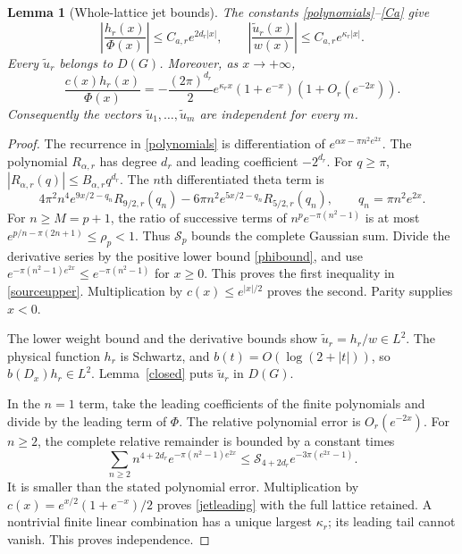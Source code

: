 \documentclass[11pt]{article}
\newtheorem{lemma}[theorem]{Lemma}
\theoremstyle{remark}
\begin{document}
\begin{lemma}[Whole-lattice jet bounds]\label{jetbounds}
The constants \eqref{polynomials}--\eqref{Ca} give
\begin{equation}\label{sourceupper}
 \left|\frac{h_r(x)}{\Phi(x)}\right|
        \le C_{a,r}e^{2d_r|x|},\qquad
 \left|\frac{\widetilde u_r(x)}{w(x)}\right|
        \le C_{a,r}e^{\kappa_r|x|}.
\end{equation}
Every \(\widetilde u_r\) belongs to \(D(G)\).
Moreover, as \(x\to+\infty\),
\begin{equation}\label{jetleading}
 \frac{c(x)h_r(x)}{\Phi(x)}
 =-\frac{(2\pi)^{d_r}}2 e^{\kappa_rx}
                  (1+e^{-x})(1+O_r(e^{-2x})).
\end{equation}
Consequently the vectors \(\widetilde u_1,\ldots,\widetilde u_m\)
are independent for every \(m\).
\end{lemma}
\begin{proof}
The recurrence in \eqref{polynomials} is differentiation of
\(e^{\alpha x-\pi n^2e^{2x}}\).
The polynomial \(R_{\alpha,r}\) has degree \(d_r\) and leading
coefficient \(-2^{d_r}\). For \(q\ge\pi\),
\(|R_{\alpha,r}(q)|\le B_{\alpha,r}q^{d_r}\).
The \(n\)th differentiated theta term is
\[
 4\pi^2n^4e^{9x/2-q_n}R_{9/2,r}(q_n)
       -6\pi n^2e^{5x/2-q_n}R_{5/2,r}(q_n),
       \qquad q_n=\pi n^2e^{2x}.
\]
For \(n\ge M=p+1\), the ratio of successive terms of
\(n^pe^{-\pi(n^2-1)}\) is at most
\(e^{p/n-\pi(2n+1)}\le\rho_p<1\).
Thus \(\mathcal S_p\) bounds the complete Gaussian sum.
Divide the derivative series by the positive lower bound
\eqref{phibound}, and use
\(e^{-\pi(n^2-1)e^{2x}}\le e^{-\pi(n^2-1)}\) for \(x\ge0\).
This proves the first inequality in \eqref{sourceupper}.
Multiplication by \(c(x)\le e^{|x|/2}\) proves the second.
Parity supplies \(x<0\).

The lower weight bound and the derivative bounds show
\(\widetilde u_r=h_r/w\in L^2\).
The physical function \(h_r\) is Schwartz, and
\(b(t)=O(\log(2+|t|))\), so \(b(D_x)h_r\in L^2\).
Lemma~\ref{closed} puts \(\widetilde u_r\) in \(D(G)\).

In the \(n=1\) term, take the leading coefficients of the finite
polynomials and divide by the leading term of \(\Phi\).
The relative polynomial error is \(O_r(e^{-2x})\).
For \(n\ge2\), the complete relative remainder is bounded by a
constant times
\[
 \sum_{n\ge2}n^{4+2d_r}e^{-\pi(n^2-1)e^{2x}}
 \le \mathcal S_{4+2d_r}
                e^{-3\pi(e^{2x}-1)}.
\]
It is smaller than the stated polynomial error. Multiplication by
\(c(x)=e^{x/2}(1+e^{-x})/2\) proves \eqref{jetleading}
with the full lattice retained.
A nontrivial finite linear combination has a unique largest
\(\kappa_r\); its leading tail cannot vanish. This proves independence.
\end{proof}
\end{document}
